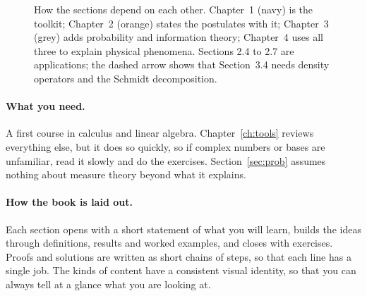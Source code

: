 \begin{figure}[htb]
  \caption{How the sections depend on each other. Chapter~1 (navy) is the toolkit; Chapter~2 (orange) states the postulates with it; Chapter~3 (grey) adds probability and information theory; Chapter~4 uses all three to explain physical phenomena. Sections 2.4 to 2.7 are applications; the dashed arrow shows that Section~3.4 needs density operators and the Schmidt decomposition.}
  \label{fig:roadmap}
\end{figure}

\paragraph{What you need.}
A first course in calculus and linear algebra. Chapter~\ref{ch:tools} reviews everything else, but it does so quickly, so if complex numbers or bases are unfamiliar, read it slowly and do the exercises. Section~\ref{sec:prob} assumes nothing about measure theory beyond what it explains.

\paragraph{How the book is laid out.}
Each section opens with a short statement of what you will learn, builds the ideas through definitions, results and worked examples, and closes with exercises. Proofs and solutions are written as short chains of steps, so that each line has a single job. The kinds of content have a consistent visual identity, so that you can always tell at a glance what you are looking at.

